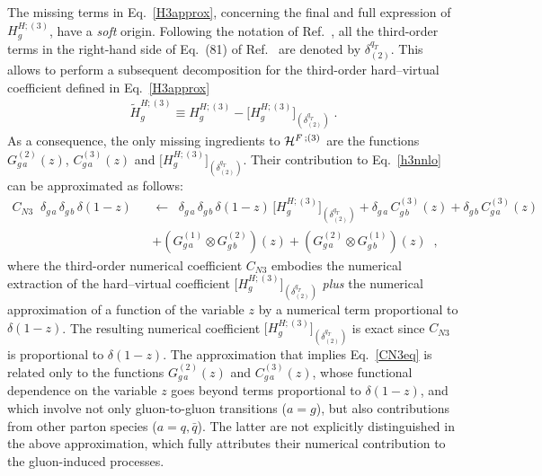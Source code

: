 \documentclass[12pt]{article}
\def\beeq{\begin{eqnarray}}
\def\eeeq{\end{eqnarray}}
\def\nn{\nonumber}
\DeclareRobustCommand{\qt}{q_T}
\begin{document}
The missing terms in Eq.~\eqref{H3approx}, concerning the final and full expression of $H^{H;(3)}_g$, have a {\em soft} origin. Following the notation of Ref.~\cite{Catani:2013tia}, all the third-order terms in the right-hand side of Eq.~(81) of Ref.~\cite{Catani:2013tia} are denoted by $\delta^{\qt}_{(2)}$. This allows to perform a subsequent decomposition for the third-order hard--virtual coefficient defined in Eq.~\eqref{H3approx}
\beeq
\label{H3deltaqT2}
\widetilde{H}^{H;(3)}_{g}  \equiv H^{H;(3)}_g  -  \big[H^{H;(3)}_{g}\big]_{(\delta^{\qt}_{(2)})} \;.
\eeeq
As a consequence, the only missing ingredients to ${\cal H}^{F \,;(3)}$  are 
 the functions $G^{(2)}_{g\,a}(z)$, $C^{(3)}_{g\,a}(z)$ and $ \big[H^{H;(3)}_{g}\big]_{(\delta^{\qt}_{(2)})}$. 
 Their contribution to  Eq.~\eqref{h3nnlo} can be approximated as follows:
\beeq
\label{CN3eq}
C_{N3}\;\;\delta_{g\,a} \,\delta_{g\,b} \,\delta(1-z) && \!\!\!\!\!\! \leftarrow\;\; \delta_{g\,a} \,\delta_{g\,b} \,\delta(1-z)
\,\big[H^{H;(3)}_{g}\big]_{(\delta^{\qt}_{(2)})}
+\delta_{g\,a} \,C^{(3)}_{g\,b}(z)+\delta_{g\,b} \,C^{(3)}_{g\,a}(z)\nn\\
&&
+\left(G^{(1)}_{g\,a}\otimes G^{(2)}_{g\,b}\right)(z)+\left(G^{(2)}_{g\,a}\otimes G^{(1)}_{g\,b}\right)(z) \;\;, 
\eeeq
where the third-order numerical coefficient $C_{N3}$ embodies the numerical extraction of the hard--virtual coefficient $\big[H^{H;(3)}_{g}\big]_{(\delta^{\qt}_{(2)})}$  \textit{plus} the numerical approximation of a function of the variable $z$ by a numerical term proportional to $\delta(1-z)$. The resulting numerical coefficient $\big[H^{H;(3)}_{g}\big]_{(\delta^{\qt}_{(2)})}$ is exact since $C_{N3}$ is proportional to $\delta(1-z)$. The approximation that implies Eq.~\eqref{CN3eq} is related only to the functions  $G^{(2)}_{g\,a}(z)$ and $C^{(3)}_{g\,a}(z)$, whose functional dependence on the variable $z$ goes beyond terms proportional to $\delta(1-z)$, and which involve not only gluon-to-gluon transitions ($a=g$), but also contributions from 
other parton species ($a=q,\bar q$). The latter are not explicitly distinguished in the above approximation, which fully 
attributes their numerical contribution to the gluon-induced processes. 
\end{document}
